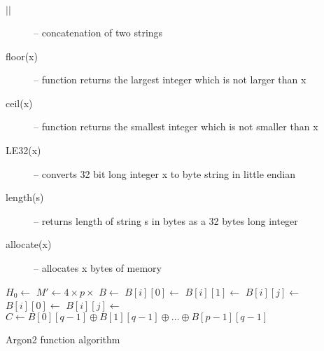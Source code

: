 \documentclass[nolof,digital]{fithesis3}
\begin{document}
\begin{description}
\item[\(||\)] -- concatenation of two strings

\item[floor(x)] -- function returns the largest integer which is not larger than x

\item[ceil(x)] -- function returns the smallest integer which is not smaller than x

\item[LE32(x)] -- converts 32 bit long integer x to byte string in little endian

\item[length(s)] -- returns length of string s in bytes as a 32 bytes long integer

\item[allocate(x)] -- allocates x bytes of memory
\end{description}

\begin{algorithm}
\DontPrintSemicolon
\LinesNumbered
{}
\(H_0 \leftarrow \)  \;
\(M' \leftarrow 4 \times p \times \)  \;
\(B \leftarrow \)  \;
 {
\(B[i][0] \leftarrow \)  \;
}
 {
\(B[i][1] \leftarrow \)  \;
}
 {
 {
\(B[i][j] \leftarrow \)  \;
}
}
 {
 {
\(B[i][0] \leftarrow \)  \;
 {
\(B[i][j] \leftarrow \)  \;
}
}
}
\(C \leftarrow B[0][q-1] \oplus B[1][q-1] \oplus \dots \oplus B[p-1][q-1]\) \;
\caption{Argon2 function algorithm}
\label{argon2alg}
\end{algorithm}
\end{document}
